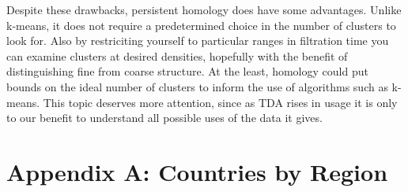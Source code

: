 \documentclass[11pt]{amsart}
\theoremstyle{remark}	  \newtheorem*{remark}{Remark}
\numberwithin{equation}{section}
\begin{document}
Despite these drawbacks, persistent homology does have some advantages. Unlike k-means, it does not require a predetermined choice in the number of clusters to look for. Also by restriciting yourself to particular ranges in filtration time you can examine clusters at desired densities, hopefully with the benefit of distinguishing fine from coarse structure. At the least, homology could put bounds on the ideal number of clusters to inform the use of algorithms such as k-means. This topic deserves more attention, since as TDA rises in usage it is only to our benefit to understand all possible uses of the data it gives.


\newpage
\section*{Appendix A: Countries by Region}
\end{document}
